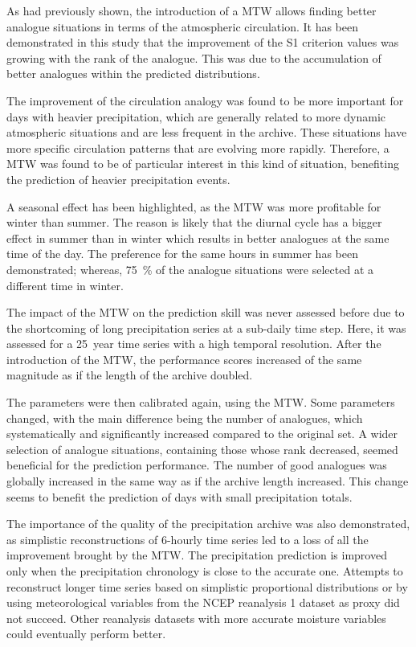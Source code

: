 \documentclass[hess, manuscript]{copernicus}
\begin{document}
	As \citet{Finet2008} had previously shown, the introduction of a MTW allows finding better analogue situations in terms of the atmospheric circulation. It has been demonstrated in this study that the improvement of the S1 criterion values was growing with the rank of the analogue. This was due to the accumulation of better analogues within the predicted distributions.
	
	The improvement of the circulation analogy was found to be more important for days with heavier precipitation, which are generally related to more dynamic atmospheric situations and are less frequent in the archive. These situations have more specific circulation patterns that are evolving more rapidly. Therefore, a MTW was found to be of particular interest in this kind of situation, benefiting the prediction of heavier precipitation events.
	
	A seasonal effect has been highlighted, as the MTW was more profitable for winter than summer. The reason is likely that the diurnal cycle has a bigger effect in summer than in winter which results in better analogues at the same time of the day. The preference for the same hours in summer has been demonstrated; whereas, 75~\% of the analogue situations were selected at a different time in winter.
	
	The impact of the MTW on the prediction skill was never assessed before due to the shortcoming of long precipitation series at a sub-daily time step. Here, it was assessed for a 25~year time series with a high temporal resolution. After the introduction of the MTW, the performance scores increased of the same magnitude as if the length of the archive doubled.
	
	The parameters were then calibrated again, using the MTW. Some parameters changed, with the main difference being the number of analogues, which systematically and significantly increased compared to the original set. A wider selection of analogue situations, containing those whose rank decreased, seemed beneficial for the prediction performance. The number of good analogues was globally increased in the same way as if the archive length increased. This change seems to benefit the prediction of days with small precipitation totals.
	
	The importance of the quality of the precipitation archive was also demonstrated, as simplistic reconstructions of 6-hourly time series led to a loss of all the improvement brought by the MTW. The precipitation prediction is improved only when the precipitation chronology is close to the accurate one. Attempts to reconstruct longer time series based on simplistic proportional distributions or by using meteorological variables from the NCEP reanalysis 1 dataset as proxy did not succeed. Other reanalysis datasets with more accurate moisture variables could eventually perform better.
	
\end{document}
